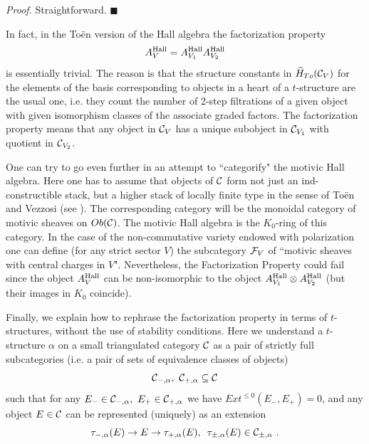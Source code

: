 \documentclass[12pt]{article}
\begin{document}
{\it Proof.} Straightforward.  $\blacksquare$


In fact, in the To\"en version of the Hall algebra  the factorization property 
$$A_V^{\operatorname{Hall}}=A_{V_1}^{\operatorname{Hall}}A_{V_2}^{\operatorname{Hall}}$$ is essentially trivial. The reason is that the structure constants
in 
$\widehat{H}_{To}({\mathcal C}_V)$
for the elements of the basis corresponding to objects in a heart of a $t$-structure are the usual one, i.e.
 they count the number of 2-step filtrations of a given object with given isomorphism classes of the associate graded factors.
The factorization property means that any object in ${\mathcal C}_V$ has a unique subobject in ${\mathcal C}_{V_1}$ with quotient in ${\mathcal C}_{V_2}$.



\begin{rmk}
One can try to go even further in an attempt to ``categorify" the motivic Hall algebra.
 Here one has to assume that objects of ${\mathcal C}$ form not just an ind-constructible stack, but 
 a higher stack of locally finite type in the sense of To\"en and Vezzosi (see \cite{ToVe}).
The corresponding category will be the monoidal category of motivic sheaves on $Ob({\mathcal C})$.
The motivic Hall algebra is the $K_0$-ring of this category. In the case of the non-commutative
variety endowed with polarization one can define (for any strict sector $V$) the subcategory
${\cal F}_V$ of ``motivic sheaves with central charges in $V$".
Nevertheless, the Factorization Property could fail since
the object $A_V^{\operatorname{Hall}}$ can be non-isomorphic to  the object $A_{V_1}^{\operatorname{Hall}}\otimes A_{V_2}^{\operatorname{Hall}}$
(but their images in $K_0$ coincide).
\end{rmk}

Finally, we explain how to rephrase the factorization property in terms of $t$-structures,
without the use of stability conditions. 
Here we understand a $t$-structure $\alpha$
on a small triangulated category $\cal C$
as a pair of strictly full subcategories (i.e. a pair of sets of equivalence classes of objects)
$${\cal C}_{-,\alpha},\,\,{\cal C}_{+,\alpha}\subseteq {\cal C}$$
such that for any $E_-\in {\cal C}_{-,\alpha},\,\,E_+\in {\cal C}_{+,\alpha}$ we have
 $Ext^{\le 0}(E_-,E_+)=0$, and any object $E\in {\cal C}$ can be represented (uniquely) as an extension
 $$\tau_{-,\alpha}(E)\to E\to \tau_{+,\alpha}(E),\,\,\,\tau_{\pm,\alpha}(E)\in {\cal C}_{\pm,\alpha}\,\,.$$
 
\end{document}
